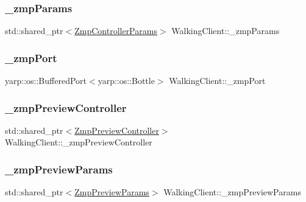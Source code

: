 \subsubsection{\texorpdfstring{\+\_\+zmp\+Params}{\_zmpParams}}
{\footnotesize\ttfamily std\+::shared\+\_\+ptr$<$\hyperlink{structZmpControllerParams}{Zmp\+Controller\+Params}$>$ Walking\+Client\+::\+\_\+zmp\+Params\hspace{0.3cm}{\ttfamily [private]}}

\hypertarget{classWalkingClient_af2e0817fa94ca802775addd22b09bf7a}{}\label{classWalkingClient_af2e0817fa94ca802775addd22b09bf7a} 
\subsubsection{\texorpdfstring{\+\_\+zmp\+Port}{\_zmpPort}}
{\footnotesize\ttfamily yarp\+::os\+::\+Buffered\+Port$<$yarp\+::os\+::\+Bottle$>$ Walking\+Client\+::\+\_\+zmp\+Port\hspace{0.3cm}{\ttfamily [private]}}

\hypertarget{classWalkingClient_ae570aa07bed9e336eda93f331f3485fb}{}\label{classWalkingClient_ae570aa07bed9e336eda93f331f3485fb} 
\subsubsection{\texorpdfstring{\+\_\+zmp\+Preview\+Controller}{\_zmpPreviewController}}
{\footnotesize\ttfamily std\+::shared\+\_\+ptr$<$\hyperlink{classZmpPreviewController}{Zmp\+Preview\+Controller}$>$ Walking\+Client\+::\+\_\+zmp\+Preview\+Controller\hspace{0.3cm}{\ttfamily [private]}}

\hypertarget{classWalkingClient_a9a2cf2d6107ab91fc5bd1d82a3b85a84}{}\label{classWalkingClient_a9a2cf2d6107ab91fc5bd1d82a3b85a84} 
\subsubsection{\texorpdfstring{\+\_\+zmp\+Preview\+Params}{\_zmpPreviewParams}}
{\footnotesize\ttfamily std\+::shared\+\_\+ptr$<$\hyperlink{structZmpPreviewParams}{Zmp\+Preview\+Params}$>$ Walking\+Client\+::\+\_\+zmp\+Preview\+Params\hspace{0.3cm}{\ttfamily [private]}}

